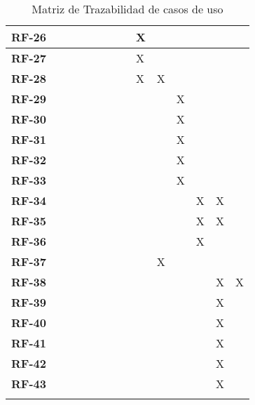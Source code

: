\begin{center}
\begin{longtable}{ c | p{0.75cm} p{0.75cm} p{0.75cm} p{0.75cm} p{0.75cm} p{0.75cm} p{0.75cm} p{0.75cm} p{0.75cm} p{0.75cm} p{0.75cm} p{0.75cm} p{0.75cm} }
	\textbf{RF-26} &  &  &  &  &  &  &  & X &  &  &  &  &  \\ \hline
	\textbf{RF-27} &  &  &  &  &  &  &  & X &  &  &  &  &  \\ \hline
	\textbf{RF-28} &  &  &  &  &  &  &  & X & X &  &  &  &  \\ \hline
	\textbf{RF-29} &  &  &  &  &  &  &  &  &  & X &  &  &  \\ \hline
	\textbf{RF-30} &  &  &  &  &  &  &  &  &  & X &  &  &  \\ \hline
	\textbf{RF-31} &  &  &  &  &  &  &  &  &  & X &  &  &  \\ \hline
	\textbf{RF-32} &  &  &  &  &  &  &  &  &  & X &  &  &  \\ \hline
	\textbf{RF-33} &  &  &  &  &  &  &  &  &  & X &  &  &  \\ \hline
	\textbf{RF-34} &  &  &  &  &  &  &  &  &  &  & X & X &  \\ \hline
	\textbf{RF-35} &  &  &  &  &  &  &  &  &  &  & X & X &  \\ \hline
	\textbf{RF-36} &  &  &  &  &  &  &  &  &  &  & X &  &  \\ \hline
	\textbf{RF-37} &  &  &  &  &  &  &  &  & X &  &  &  &  \\ \hline
	\textbf{RF-38} &  &  &  &  &  &  &  &  &  &  &  & X & X \\ \hline
	\textbf{RF-39} &  &  &  &  &  &  &  &  &  &  &  & X &  \\ \hline
	\textbf{RF-40} &  &  &  &  &  &  &  &  &  &  &  & X &  \\ \hline
	\textbf{RF-41} &  &  &  &  &  &  &  &  &  &  &  & X &  \\ \hline
	\textbf{RF-42} &  &  &  &  &  &  &  &  &  &  &  & X &  \\ \hline
	\textbf{RF-43} &  &  &  &  &  &  &  &  &  &  &  & X &  \\ \hline

\caption{Matriz de Trazabilidad de casos de uso}
\label{tab:matriztraz}
\end{longtable}
\end{center}
